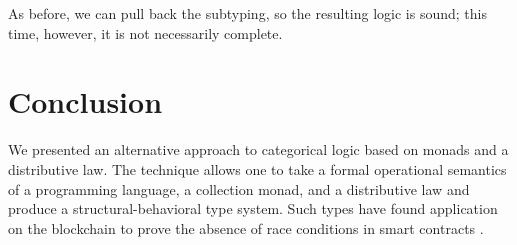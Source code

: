 \documentclass[sigplan,9pt,review,anonymous]{acmart}\settopmatter{printfolios=true,printccs=false,printacmref=false}
\begin{document}
As before, we can pull back the subtyping, so the resulting logic is sound; this time, however, it is not necessarily complete.

\section{Conclusion}

We presented an alternative approach to categorical logic based on monads and a distributive law.  The technique allows one to take a formal operational semantics of a programming language, a collection monad, and a distributive law and produce a structural-behavioral type system.  Such types have found application on the blockchain to prove the absence of race conditions in smart contracts \cite{PettersonMeredith}.






\end{document}
